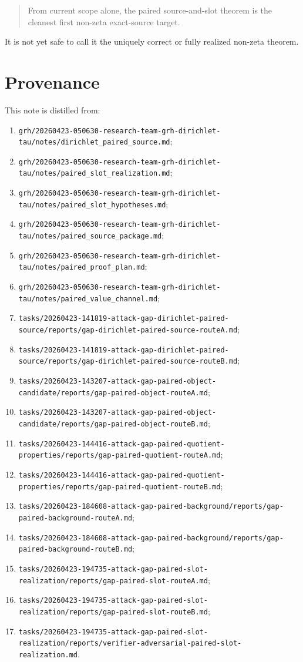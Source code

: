 \documentclass[11pt]{article}
\begin{document}
\begin{quote}
From current scope alone, the paired source-and-slot theorem is the cleanest
first non-zeta exact-source target.
\end{quote}

It is not yet safe to call it the uniquely correct or fully realized non-zeta
theorem.

\section{Provenance}

This note is distilled from:

\begin{enumerate}
\item \texttt{grh/20260423-050630-research-team-grh-dirichlet-tau/notes/dirichlet\_paired\_source.md};
\item \texttt{grh/20260423-050630-research-team-grh-dirichlet-tau/notes/paired\_slot\_realization.md};
\item \texttt{grh/20260423-050630-research-team-grh-dirichlet-tau/notes/paired\_slot\_hypotheses.md};
\item \texttt{grh/20260423-050630-research-team-grh-dirichlet-tau/notes/paired\_source\_package.md};
\item \texttt{grh/20260423-050630-research-team-grh-dirichlet-tau/notes/paired\_proof\_plan.md};
\item \texttt{grh/20260423-050630-research-team-grh-dirichlet-tau/notes/paired\_value\_channel.md};
\item \texttt{tasks/20260423-141819-attack-gap-dirichlet-paired-source/reports/gap-dirichlet-paired-source-routeA.md};
\item \texttt{tasks/20260423-141819-attack-gap-dirichlet-paired-source/reports/gap-dirichlet-paired-source-routeB.md};
\item \texttt{tasks/20260423-143207-attack-gap-paired-object-candidate/reports/gap-paired-object-routeA.md};
\item \texttt{tasks/20260423-143207-attack-gap-paired-object-candidate/reports/gap-paired-object-routeB.md};
\item \texttt{tasks/20260423-144416-attack-gap-paired-quotient-properties/reports/gap-paired-quotient-routeA.md};
\item \texttt{tasks/20260423-144416-attack-gap-paired-quotient-properties/reports/gap-paired-quotient-routeB.md};
\item \texttt{tasks/20260423-184608-attack-gap-paired-background/reports/gap-paired-background-routeA.md};
\item \texttt{tasks/20260423-184608-attack-gap-paired-background/reports/gap-paired-background-routeB.md};
\item \texttt{tasks/20260423-194735-attack-gap-paired-slot-realization/reports/gap-paired-slot-routeA.md};
\item \texttt{tasks/20260423-194735-attack-gap-paired-slot-realization/reports/gap-paired-slot-routeB.md};
\item \texttt{tasks/20260423-194735-attack-gap-paired-slot-realization/reports/verifier-adversarial-paired-slot-realization.md}.
\end{enumerate}
\end{document}
